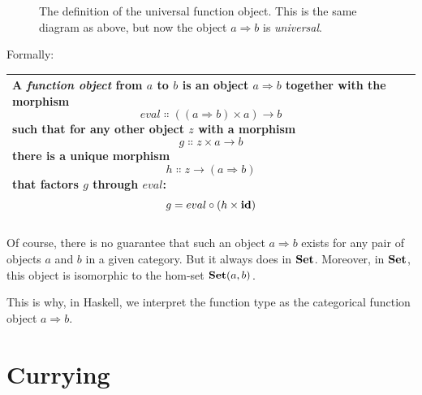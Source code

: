 \begin{figure}[H]
\centering
{}
\caption{The definition of the universal function object. This is the same
diagram as above, but now the object $a{\Rightarrow}b$ is \emph{universal}.}
\end{figure}

\noindent
Formally:

\begin{longtable}[]{@{}l@{}}
\toprule
\begin{minipage}[t]{0.97\columnwidth}\raggedright\strut
A \emph{function object} from $a$ to $b$ is an object
$a{\Rightarrow}b$ together with the morphism
\[eval \Colon ((a \Rightarrow b) \times a) \to b\]
such that for any other object $z$ with a morphism
\[g \Colon z \times a \to b\]
there is a unique morphism
\[h \Colon z \to (a \Rightarrow b)\]
that factors $g$ through $eval$:
\[g = eval \circ (h \times \mathbf{id})\]
\end{minipage}\tabularnewline
\bottomrule
\end{longtable}

\noindent
Of course, there is no guarantee that such an object $a{\Rightarrow} b$ exists
for any pair of objects $a$ and $b$ in a given category.
But it always does in $\mathbf{Set}$. Moreover, in $\mathbf{Set}$, this
object is isomorphic to the hom-set $\mathbf{Set}(a, b)$.

This is why, in Haskell, we interpret the function type
 as the categorical function object $a{\Rightarrow} b$.

\section{Currying}\label{currying}

